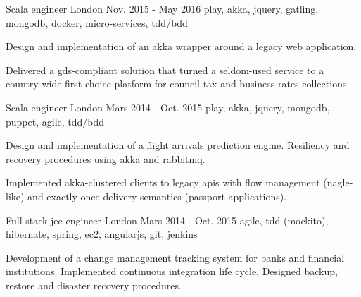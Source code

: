 \begin{cventries}
  \cventry
    {Scala engineer} %
    {} %
    {London} %
    {Nov. 2015 - May 2016} %
    {play, akka, jquery, gatling, mongodb, docker, micro-services, tdd/bdd} %
    {
      \begin{cvitems} %
        \item {Design and implementation of an akka wrapper around a legacy web application.}
        \item {Delivered a gds-compliant solution that turned a seldom-used service to a country-wide first-choice platform for council tax and business rates collections.}
      \end{cvitems}
    }

  \cventry
    {Scala engineer} %
    {} %
    {London} %
    {Mars 2014 - Oct. 2015} %
    {play, akka, jquery, mongodb, puppet, agile, tdd/bdd} %
    {
      \begin{cvitems} %
        \item {Design and implementation of a flight arrivals prediction engine. Resiliency and recovery procedures using akka and rabbitmq.}
        \item {Implemented akka-clustered clients to legacy apis with flow management (nagle-like) and exactly-once delivery semantics (passport applications).}
      \end{cvitems}
    }

  \cventry
    {Full stack jee engineer} %
    {} %
    {London} %
    {Mars 2014 - Oct. 2015} %
    {agile, tdd (mockito), hibernate, spring, ec2, angularjs, git, jenkins} %
    {
      \begin{cvitems} %
        \item {Development of a change management tracking system for banks and financial institutions. Implemented continuous integration life cycle. Designed backup, restore and disaster recovery procedures.}
      \end{cvitems}
    }


\end{cventries}
